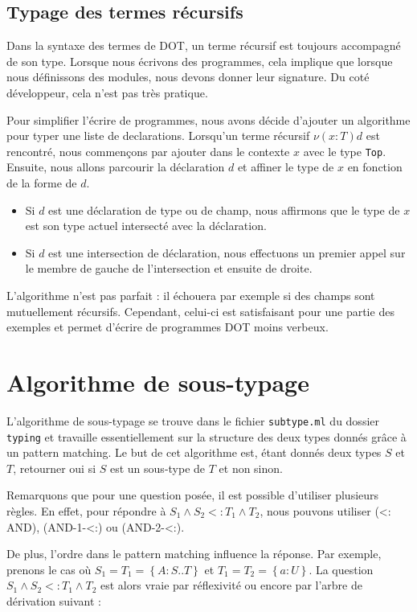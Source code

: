 \subsection*{Typage des termes récursifs}

Dans la syntaxe des termes de DOT, un terme récursif est toujours accompagné de
son type. Lorsque nous écrivons des programmes, cela implique que lorsque nous
définissons des modules, nous devons donner leur signature. Du
coté développeur, cela n'est pas très pratique.

Pour simplifier l'écrire de programmes, nous avons décide d'ajouter un algorithme pour typer une liste de
declarations. Lorsqu'un terme récursif $\nu(x : T) d$ est rencontré,
nous commençons par ajouter dans le contexte $x$ avec le type \verb|Top|.
Ensuite, nous allons parcourir la déclaration $d$ et affiner le type de $x$ en
fonction de la forme de $d$.
\begin{itemize}
\item Si $d$ est une déclaration de type ou de champ, nous affirmons que le type de $x$ est
  son type actuel intersecté avec la déclaration.
\item Si $d$ est une intersection de déclaration, nous effectuons un premier
  appel sur le membre de gauche de l'intersection et ensuite de droite.
\end{itemize}

L'algorithme n'est pas parfait : il échouera par exemple si des champs sont
mutuellement récursifs. 
Cependant, celui-ci est satisfaisant pour une partie des exemples et permet
d'écrire de programmes DOT moins verbeux.

\section{Algorithme de sous-typage}

L'algorithme de sous-typage se trouve dans le fichier \verb|subtype.ml| du dossier
\verb|typing| et travaille essentiellement sur la structure des deux types
donnés grâce à un pattern matching. Le but de cet algorithme est, étant donnés
deux types $S$ et $T$, retourner oui si $S$ est un sous-type de $T$ et non sinon.

Remarquons que pour une question posée, il est possible
d'utiliser plusieurs règles.
En effet, pour répondre à $S_{1} \wedge S_{2} <: T_{1} \wedge T_{2}$, nous
pouvons utiliser (<: AND), (AND-1-<:) ou (AND-2-<:).

De plus, l'ordre dans le pattern matching influence la réponse. Par exemple,
prenons le cas où $S_{1} = T_{1} = \left\{ A : S .. T \right\}$ et $T_{1} =
T_{2} = \left\{ a : U\right\}$. La question $S_{1} \wedge S_{2} <: T_{1} \wedge
T_{2}$ est alors vraie par réflexivité ou encore par l'arbre de dérivation
suivant :

